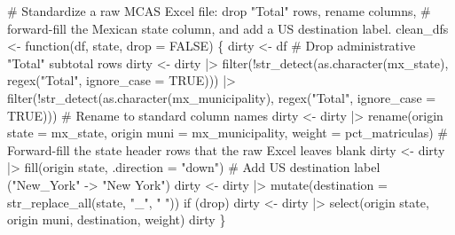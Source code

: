 \documentclass[
  11pt,
  letterpaper,
  DIV=11,
  numbers=noendperiod]{scrartcl}
\newenvironment{Shaded}{}{}
\newcommand{\AttributeTok}[1]{\textcolor[rgb]{0.84,0.23,0.29}{#1}}
\newcommand{\CommentTok}[1]{\textcolor[rgb]{0.42,0.45,0.49}{#1}}
\newcommand{\ConstantTok}[1]{\textcolor[rgb]{0.00,0.36,0.77}{#1}}
\newcommand{\ControlFlowTok}[1]{\textcolor[rgb]{0.84,0.23,0.29}{#1}}
\newcommand{\FunctionTok}[1]{\textcolor[rgb]{0.44,0.26,0.76}{#1}}
\newcommand{\NormalTok}[1]{\textcolor[rgb]{0.14,0.16,0.18}{#1}}
\newcommand{\OtherTok}[1]{\textcolor[rgb]{0.44,0.26,0.76}{#1}}
\newcommand{\SpecialCharTok}[1]{\textcolor[rgb]{0.00,0.36,0.77}{#1}}
\newcommand{\StringTok}[1]{\textcolor[rgb]{0.01,0.18,0.38}{#1}}
\begin{document}
\begin{Shaded}
\begin{Highlighting}[]
\CommentTok{\# Standardize a raw MCAS Excel file: drop "Total" rows, rename columns,}
\CommentTok{\# forward{-}fill the Mexican state column, and add a US destination label.}
\NormalTok{clean\_dfs }\OtherTok{\textless{}{-}} \ControlFlowTok{function}\NormalTok{(df, state, }\AttributeTok{drop =} \ConstantTok{FALSE}\NormalTok{) \{}
\NormalTok{  dirty }\OtherTok{\textless{}{-}}\NormalTok{ df}
  \CommentTok{\# Drop administrative "Total" subtotal rows}
\NormalTok{  dirty }\OtherTok{\textless{}{-}}\NormalTok{ dirty }\SpecialCharTok{|\textgreater{}}
    \FunctionTok{filter}\NormalTok{(}\SpecialCharTok{!}\FunctionTok{str\_detect}\NormalTok{(}\FunctionTok{as.character}\NormalTok{(mx\_state),}
                       \FunctionTok{regex}\NormalTok{(}\StringTok{"Total"}\NormalTok{, }\AttributeTok{ignore\_case =} \ConstantTok{TRUE}\NormalTok{))) }\SpecialCharTok{|\textgreater{}}
    \FunctionTok{filter}\NormalTok{(}\SpecialCharTok{!}\FunctionTok{str\_detect}\NormalTok{(}\FunctionTok{as.character}\NormalTok{(mx\_municipality),}
                       \FunctionTok{regex}\NormalTok{(}\StringTok{"Total"}\NormalTok{, }\AttributeTok{ignore\_case =} \ConstantTok{TRUE}\NormalTok{)))}
  \CommentTok{\# Rename to standard column names}
\NormalTok{  dirty }\OtherTok{\textless{}{-}}\NormalTok{ dirty }\SpecialCharTok{|\textgreater{}}
    \FunctionTok{rename}\NormalTok{(}\StringTok{\textasciigrave{}}\AttributeTok{origin state}\StringTok{\textasciigrave{}} \OtherTok{=}\NormalTok{ mx\_state,}
           \StringTok{\textasciigrave{}}\AttributeTok{origin muni}\StringTok{\textasciigrave{}}  \OtherTok{=}\NormalTok{ mx\_municipality,}
           \AttributeTok{weight         =}\NormalTok{ pct\_matriculas)}
  \CommentTok{\# Forward{-}fill the state header rows that the raw Excel leaves blank}
\NormalTok{  dirty }\OtherTok{\textless{}{-}}\NormalTok{ dirty }\SpecialCharTok{|\textgreater{}} \FunctionTok{fill}\NormalTok{(}\StringTok{\textasciigrave{}}\AttributeTok{origin state}\StringTok{\textasciigrave{}}\NormalTok{, }\AttributeTok{.direction =} \StringTok{"down"}\NormalTok{)}
  \CommentTok{\# Add US destination label ("New\_York" {-}\textgreater{} "New York")}
\NormalTok{  dirty }\OtherTok{\textless{}{-}}\NormalTok{ dirty }\SpecialCharTok{|\textgreater{}} \FunctionTok{mutate}\NormalTok{(}\AttributeTok{destination =} \FunctionTok{str\_replace\_all}\NormalTok{(state, }\StringTok{"\_"}\NormalTok{, }\StringTok{" "}\NormalTok{))}
  \ControlFlowTok{if}\NormalTok{ (drop) dirty }\OtherTok{\textless{}{-}}\NormalTok{ dirty }\SpecialCharTok{|\textgreater{}}
    \FunctionTok{select}\NormalTok{(}\StringTok{\textasciigrave{}}\AttributeTok{origin state}\StringTok{\textasciigrave{}}\NormalTok{, }\StringTok{\textasciigrave{}}\AttributeTok{origin muni}\StringTok{\textasciigrave{}}\NormalTok{, destination, weight)}
\NormalTok{  dirty}
\NormalTok{\}}
\end{Highlighting}
\end{Shaded}
\end{document}
